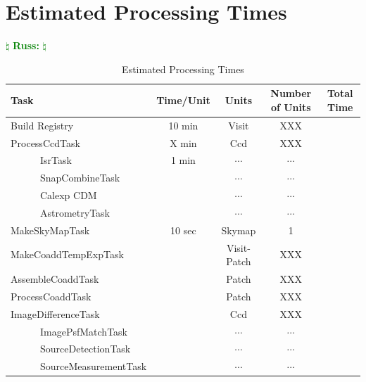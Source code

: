 \documentclass[12pt]{article}
\newcommand{\russ} { \textcolor{green} {
\ensuremath{\natural} {\bf Russ:}  
\ensuremath{\natural} } }
\begin{document}

\clearpage 
\section{Estimated Processing Times} \russ

\begin{table}[h]
\small
\begin{center}
\caption{\label{tab-pars} Estimated Processing Times}
\begin{tabular}{lcccc}
\hline \hline
Task                          & Time/Unit     & Units        & Number of Units & Total Time\\
\hline
Build Registry                & 10 min        & Visit        & XXX             &           \\ 
ProcessCcdTask                & X min         & Ccd          & XXX             &           \\ %
~~~~~~IsrTask                 & 1 min         & $\cdots$     & $\cdots$        &           \\
~~~~~~SnapCombineTask         &               & $\cdots$     & $\cdots$        &           \\
~~~~~~Calexp CDM              &               & $\cdots$     & $\cdots$        &           \\
~~~~~~AstrometryTask          &               & $\cdots$     & $\cdots$        &           \\
MakeSkyMapTask                & 10 sec        & Skymap       & 1               &           \\
MakeCoaddTempExpTask          &               & Visit-Patch  & XXX             &           \\
AssembleCoaddTask             &               & Patch        & XXX             &           \\   
ProcessCoaddTask              &               & Patch        & XXX             &           \\
ImageDifferenceTask           &               & Ccd          & XXX             &           \\
~~~~~~ImagePsfMatchTask       &               & $\cdots$     & $\cdots$        &           \\
~~~~~~SourceDetectionTask     &               & $\cdots$     & $\cdots$        &           \\
~~~~~~SourceMeasurementTask   &               & $\cdots$     & $\cdots$        &           \\

\end{tabular}
\end{center}
\end{table}
\end{document}
